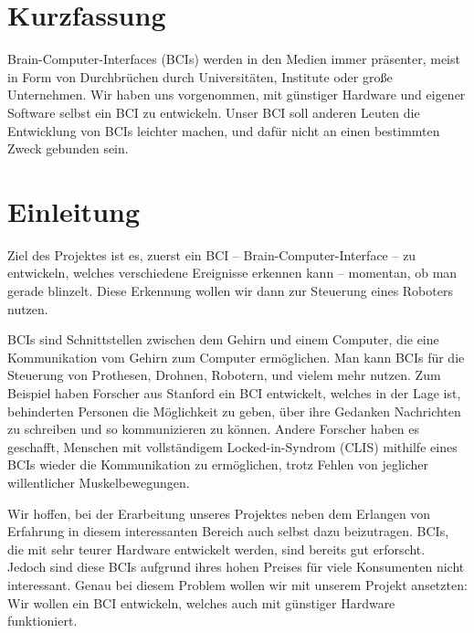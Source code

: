\documentclass[11pt]{scrartcl}
\begin{document}
	\newpage

	
	\tableofcontents
	
	\newpage


	\section{Kurzfassung}

	Brain-Computer-Interfaces (BCIs) werden in den Medien immer präsenter, meist in Form von Durchbrüchen durch Universitäten, Institute oder große Unternehmen.
	Wir haben uns vorgenommen, mit günstiger Hardware und eigener Software selbst ein BCI zu entwickeln. Unser BCI soll anderen Leuten die Entwicklung von BCIs leichter machen, und dafür nicht an einen bestimmten Zweck gebunden sein.

	\section{Einleitung}

	Ziel des Projektes ist es, zuerst ein BCI -- Brain-Computer-Interface -- zu entwickeln, welches verschiedene Ereignisse erkennen kann -- momentan, ob man gerade blinzelt. Diese Erkennung wollen wir dann zur Steuerung eines Roboters nutzen.

	BCIs sind Schnittstellen zwischen dem Gehirn und einem Computer, die eine Kommunikation vom Gehirn zum Computer ermöglichen. Man kann BCIs für die Steuerung von Prothesen, Drohnen, Robotern, und vielem mehr nutzen. \cite{bci-explained}
	Zum Beispiel haben Forscher aus Stanford ein BCI entwickelt, welches in der Lage ist, behinderten Personen die Möglichkeit zu geben, über ihre Gedanken Nachrichten zu schreiben und so kommunizieren zu können. \cite{brain2text}
	Andere Forscher haben es geschafft, Menschen mit vollständigem Locked-in-Syndrom (CLIS) mithilfe eines BCIs wieder die Kommunikation zu ermöglichen, trotz Fehlen von jeglicher willentlicher Muskelbewegungen. \cite{BCIChaudhary}
	
	Wir hoffen, bei der Erarbeitung unseres Projektes neben dem Erlangen von Erfahrung in diesem interessanten Bereich auch selbst dazu beizutragen. BCIs, die mit sehr teurer Hardware entwickelt werden, sind bereits gut erforscht. Jedoch sind diese BCIs aufgrund ihres hohen Preises für viele Konsumenten nicht interessant. Genau bei diesem Problem wollen wir mit unserem Projekt ansetzten: Wir wollen ein BCI entwickeln, welches auch mit günstiger Hardware funktioniert.
	
\end{document}
